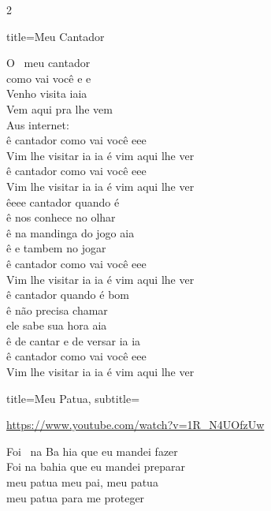 \documentclass[fontsize=14pt, paper=a4, twoside, DIV=20]{scrreprt} %
\begin{document}
\begin{multicols*}{2}
\begin{song}{title={Meu Cantador}}
        \begin{verse*}
            O \ meu cantador\\
            como vai você e e\\
            Venho visita iaia\\
            Vem aqui pra lhe vem\\
            Aus internet:\\
            ê cantador como vai você eee\\
            Vim lhe visitar ia ia é vim aqui lhe ver\\
            ê cantador como vai você eee\\
            Vim lhe visitar ia ia é vim aqui lhe ver\\
            êeee cantador quando é\\
            ê nos conhece no olhar\\
            ê na mandinga do jogo aia\\
            ê e tambem no jogar\\
            ê cantador como vai você eee\\
            Vim lhe visitar ia ia é vim aqui lhe ver\\
            ê cantador quando é bom\\
            ê não precisa chamar\\
            ele sabe sua hora aia\\
            ê de cantar e de versar ia ia\\
            ê cantador como vai você eee\\
            Vim lhe visitar ia ia é vim aqui lhe ver\\
        \end{verse*}
\end{song}

\begin{song}{title={Meu Patua}, subtitle={\begin{small}
            \url{https://www.youtube.com/watch?v=1R_N4UOfzUw}
    \end{small}}

}
        \begin{verse*}
            Foi \ na Ba hia que eu mandei fazer\\
            Foi na bahia que eu mandei preparar\\
            meu patua meu pai, meu patua\\
            meu patua para me proteger\\


\end{verse*}
\end{song}
\end{multicols*}
\end{document}
